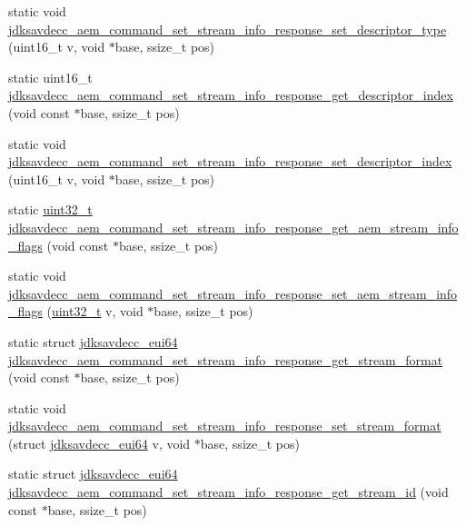 \begin{DoxyCompactItemize}
static void \hyperlink{group__command__set__stream__info__response_ga1a2030f0d3c5afe40adb9ba8f2c4e601}{jdksavdecc\+\_\+aem\+\_\+command\+\_\+set\+\_\+stream\+\_\+info\+\_\+response\+\_\+set\+\_\+descriptor\+\_\+type} (uint16\+\_\+t v, void $\ast$base, ssize\+\_\+t pos)
\item 
static uint16\+\_\+t \hyperlink{group__command__set__stream__info__response_ga5beccd46178ec84a68905e0520124ef5}{jdksavdecc\+\_\+aem\+\_\+command\+\_\+set\+\_\+stream\+\_\+info\+\_\+response\+\_\+get\+\_\+descriptor\+\_\+index} (void const $\ast$base, ssize\+\_\+t pos)
\item 
static void \hyperlink{group__command__set__stream__info__response_ga2f864a84f4004dae617a9f058a20e0e5}{jdksavdecc\+\_\+aem\+\_\+command\+\_\+set\+\_\+stream\+\_\+info\+\_\+response\+\_\+set\+\_\+descriptor\+\_\+index} (uint16\+\_\+t v, void $\ast$base, ssize\+\_\+t pos)
\item 
static \hyperlink{parse_8c_a6eb1e68cc391dd753bc8ce896dbb8315}{uint32\+\_\+t} \hyperlink{group__command__set__stream__info__response_gaf15d543a9197e58bc71d1676fd0d880c}{jdksavdecc\+\_\+aem\+\_\+command\+\_\+set\+\_\+stream\+\_\+info\+\_\+response\+\_\+get\+\_\+aem\+\_\+stream\+\_\+info\+\_\+flags} (void const $\ast$base, ssize\+\_\+t pos)
\item 
static void \hyperlink{group__command__set__stream__info__response_gacbde797a81de40fbe40ceed5bf02cd9d}{jdksavdecc\+\_\+aem\+\_\+command\+\_\+set\+\_\+stream\+\_\+info\+\_\+response\+\_\+set\+\_\+aem\+\_\+stream\+\_\+info\+\_\+flags} (\hyperlink{parse_8c_a6eb1e68cc391dd753bc8ce896dbb8315}{uint32\+\_\+t} v, void $\ast$base, ssize\+\_\+t pos)
\item 
static struct \hyperlink{structjdksavdecc__eui64}{jdksavdecc\+\_\+eui64} \hyperlink{group__command__set__stream__info__response_ga68def33404fd92dcfe5c8d0b48a35b2f}{jdksavdecc\+\_\+aem\+\_\+command\+\_\+set\+\_\+stream\+\_\+info\+\_\+response\+\_\+get\+\_\+stream\+\_\+format} (void const $\ast$base, ssize\+\_\+t pos)
\item 
static void \hyperlink{group__command__set__stream__info__response_gaef64a7d1a863402c243688e2221b84f5}{jdksavdecc\+\_\+aem\+\_\+command\+\_\+set\+\_\+stream\+\_\+info\+\_\+response\+\_\+set\+\_\+stream\+\_\+format} (struct \hyperlink{structjdksavdecc__eui64}{jdksavdecc\+\_\+eui64} v, void $\ast$base, ssize\+\_\+t pos)
\item 
static struct \hyperlink{structjdksavdecc__eui64}{jdksavdecc\+\_\+eui64} \hyperlink{group__command__set__stream__info__response_ga6a884a660e0368fee44b9f88ec11609f}{jdksavdecc\+\_\+aem\+\_\+command\+\_\+set\+\_\+stream\+\_\+info\+\_\+response\+\_\+get\+\_\+stream\+\_\+id} (void const $\ast$base, ssize\+\_\+t pos)

\end{DoxyCompactItemize}
